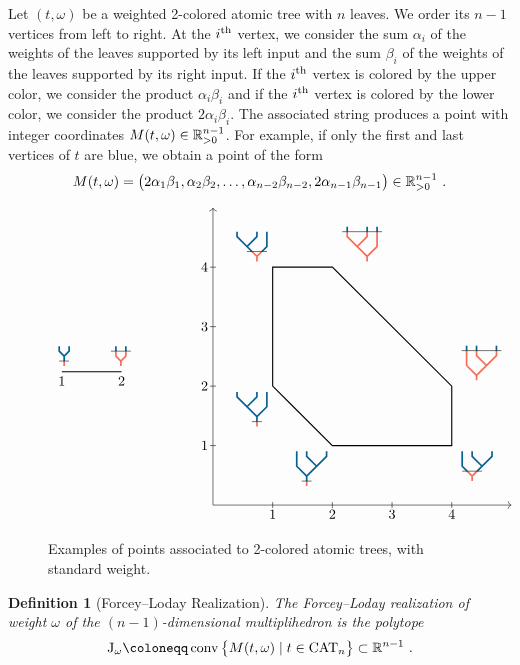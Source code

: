 \documentclass[10pt]{amsart}
\newtheorem{definition}{Definition}[section]
\theoremstyle{remark}
\begin{document}
Let $(t, \omega)$ be a weighted 2-colored atomic tree with $n$ leaves. We order its $n-1$ vertices from left to right. At the $i^{\rm th}$ vertex, we consider the sum $\alpha_i$ of the weights of the leaves supported by its left input and 
 the sum $\beta_i$ of the weights of the leaves supported by its right input. 
If the $i^{\rm th}$ vertex is colored by the upper color, we consider the product $\alpha_i\beta_i$ and if the 
$i^{\rm th}$ vertex is colored by the lower color, we consider the product $2\alpha_i\beta_i$.
The associated string produces a point with integer coordinates $M(t, \omega) \in \mathbb{R}_{>0}^{n-1}$. 
For example, if only the first and last vertices of $t$ are blue, we obtain a point of the form
\[M(t, \omega) = \big(2\alpha_1\beta_1, \alpha_2\beta_2, \ldots, \alpha_{n-2}\beta_{n-2}, 2\alpha_{n-1}\beta_{n-1}\big)\in 
\mathbb{R}_{>0}^{n-1}\ . \]
\begin{figure}[h!]
\[
\vcenter{\hbox{\begin{tikzpicture}[scale=1.5]
\draw[thick] (1,0)--(2,0);
\draw (1,0) node[above] {$\TreeBa$};
\draw (1.95,0) node[above] {$\TreeBb$};
\draw (1,0) node[below] {$1$};
\draw (2,0) node[below] {$2$};
\end{tikzpicture}}} \qquad \qquad
\vcenter{\hbox{
\begin{tikzpicture}[scale=1.5]
\draw (1,-0.05)--(1,0.05);
\draw (2,-0.05)--(2,0.05);
\draw (3,-0.05)--(3,0.05);
\draw (4,-0.05)--(4,0.05);
\draw (-0.05, 1)--(0.05,1);
\draw (-0.05, 2)--(0.05,2);
\draw (-0.05, 3)--(0.05,3);
\draw (-0.05, 4)--(0.05,4);
\draw[->] (0,0)--(5,0);
\draw[->] (0,0)--(0,5);
\draw (1,0) node[below] {$1$};
\draw (2,0) node[below] {$2$};
\draw (3,0) node[below] {$3$};
\draw (4,0) node[below] {$4$};
\draw (0,1) node[left] {$1$};
\draw (0,2) node[left] {$2$};
\draw (0,3) node[left] {$3$};
\draw (0,4) node[left] {$4$};
\draw[thick] (1,2)--(1,4)--(2,4)--(4,2)--(4,1)--(2,1)--cycle;
\draw (1,2) node[below left] {$\TreeLa$};
\draw (2,1) node[below left] {$\TreeRa$};
\draw (2,4) node[above right] {$\TreeLc$};
\draw (4,2) node[above right] {$\TreeRc$};
\draw (1,4) node[above left] {$\TreeLb$};
\draw (4,1) node[below right] {$\TreeRb$};
\end{tikzpicture}}}
\]
\caption{Examples of points associated to 2-colored atomic trees, with standard weight.}
\end{figure}


\begin{definition}[Forcey--Loday Realization] \label{def:ForceyLoday}
 The \emph{Forcey--Loday realization of weight $\omega$} of the $(n-1)$-dimensional multiplihedron is the  polytope
\[\J_\omega \coloneqq \conv \big\{M(t, \omega)\mid t\in \CMT{n} \big\}\subset \RR^{n-1}\ .\]
\end{definition}
\end{document}

